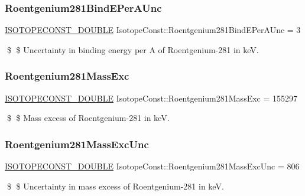 \subsubsection{\texorpdfstring{Roentgenium281\+Bind\+E\+Per\+A\+Unc}{Roentgenium281BindEPerAUnc}}
{\footnotesize\ttfamily \mbox{\hyperlink{group___isotope_const-_macros_ga8f45a7272ce02c0b4c65c44636ed719a}{I\+S\+O\+T\+O\+P\+E\+C\+O\+N\+S\+T\+\_\+\+D\+O\+U\+B\+LE}} Isotope\+Const\+::\+Roentgenium281\+Bind\+E\+Per\+A\+Unc = 3}

\$ \$ Uncertainty in binding energy per A of Roentgenium-\/281 in keV. \mbox{\label{group___isotope_const-_roentgenium-_rg281_ga021ad48ba3f9a9b7bfa0f8512f98144b}} 
\subsubsection{\texorpdfstring{Roentgenium281\+Mass\+Exc}{Roentgenium281MassExc}}
{\footnotesize\ttfamily \mbox{\hyperlink{group___isotope_const-_macros_ga8f45a7272ce02c0b4c65c44636ed719a}{I\+S\+O\+T\+O\+P\+E\+C\+O\+N\+S\+T\+\_\+\+D\+O\+U\+B\+LE}} Isotope\+Const\+::\+Roentgenium281\+Mass\+Exc = 155297}

\$ \$ Mass excess of Roentgenium-\/281 in keV. \mbox{\label{group___isotope_const-_roentgenium-_rg281_ga7e744cd36a11f6fdd2802c50e5b8ee4c}} 
\subsubsection{\texorpdfstring{Roentgenium281\+Mass\+Exc\+Unc}{Roentgenium281MassExcUnc}}
{\footnotesize\ttfamily \mbox{\hyperlink{group___isotope_const-_macros_ga8f45a7272ce02c0b4c65c44636ed719a}{I\+S\+O\+T\+O\+P\+E\+C\+O\+N\+S\+T\+\_\+\+D\+O\+U\+B\+LE}} Isotope\+Const\+::\+Roentgenium281\+Mass\+Exc\+Unc = 806}

\$ \$ Uncertainty in mass excess of Roentgenium-\/281 in keV. \mbox{\label{group___isotope_const-_roentgenium-_rg281_ga6b322bdc014d81989501512625663e86}} 
